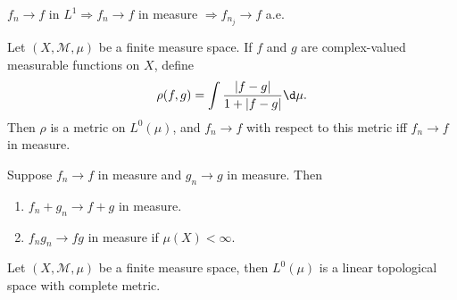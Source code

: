 \documentclass[12pt, a4paper, oneside]{book}
\begin{document}
\begin{proposition}[Riesz's]
    $f_n \rightarrow f$ in $L^1 \Rightarrow f_n \rightarrow f$ in measure $\Rightarrow f_{n_j}\rightarrow f$ a.e.
\end{proposition}








\begin{proposition}
    Let $\left(X,\mathcal{M},\mu\right)$ be a finite measure space.
    If $f$ and $g$ are complex-valued measurable functions on $X$, define
    \begin{equation*}
        \rho(f, g)=\int \frac{|f-g|}{1+|f-g|} \d \mu .
    \end{equation*}
    Then $\rho$ is a metric on $L^0\left(\mu\right)$, and $f_n \rightarrow f$ with respect to this metric iff $f_n \rightarrow f$ in measure.
\end{proposition}

\begin{proposition}
    Suppose $f_n \rightarrow f$ in measure and $g_n \rightarrow g$ in measure. Then
    \begin{enumerate}
        \item
              $f_n+g_n \rightarrow f+g$ in measure.

        \item
              $f_n g_n \rightarrow f g$ in measure if $\mu(X)<\infty$.
    \end{enumerate}

\end{proposition}


\begin{theorem}
    Let $\left(X,\mathcal{M},\mu\right)$ be a finite measure space, then $L^0\left(\mu\right)$ is a linear topological space with complete metric.
\end{theorem}
\end{document}
